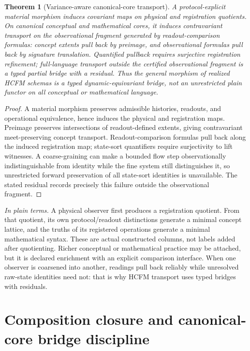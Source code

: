 \documentclass[11pt]{article}
\newtheorem{theorem}{Theorem}
\theoremstyle{definition}
\newcommand{\plainterms}{\emph{In plain terms.}}
\begin{document}
\begin{theorem}[Variance-aware canonical-core transport]
\label{thm:variance-aware-transport}
A protocol-explicit material morphism induces covariant maps on physical and registration quotients. On canonical conceptual and mathematical cores, it induces contravariant transport on the observational fragment generated by readout-comparison formulas: concept extents pull back by preimage, and observational formulas pull back by signature translation. Quantified pullback requires surjective registration refinement; full-language transport outside the certified observational fragment is a typed partial bridge with a residual. Thus the general morphism of realized HCFM schemas is a typed dynamic-equivariant bridge, not an unrestricted plain functor on all conceptual or mathematical language.
\end{theorem}

\begin{proof}
A material morphism preserves admissible histories, readouts, and operational equivalence, hence induces the physical and registration maps. Preimage preserves intersections of readout-defined extents, giving contravariant meet-preserving concept transport. Readout-comparison formulas pull back along the induced registration map; state-sort quantifiers require surjectivity to lift witnesses. A coarse-graining can make a bounded flow step observationally indistinguishable from identity while the fine system still distinguishes it, so unrestricted forward preservation of all state-sort identities is unavailable. The stated residual records precisely this failure outside the observational fragment.
\end{proof}

\noindent\plainterms{} A physical observer first produces a registration quotient. From that quotient, its own protocol/readout distinctions generate a minimal concept lattice, and the truths of its registered operations generate a minimal mathematical syntax. These are actual constructed columns, not labels added after quotienting. Richer conceptual or mathematical practice may be attached, but it is declared enrichment with an explicit comparison interface. When one observer is coarsened into another, readings pull back reliably while unresolved raw-state identities need not: that is why HCFM transport uses typed bridges with residuals.

\section{Composition closure and canonical-core bridge discipline}
\end{document}
